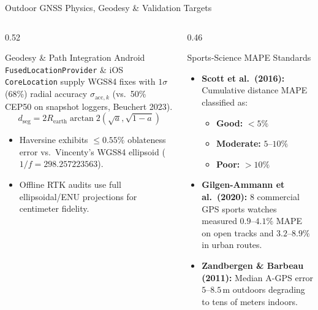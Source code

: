 \documentclass[aspectratio=169,10pt]{beamer}
\begin{document}
\begin{frame}{Outdoor GNSS Physics, Geodesy \& Validation Targets}
  \begin{columns}[T]
    \begin{column}{0.52\textwidth}
      \begin{block}{Geodesy \& Path Integration}
        \small
        Android \texttt{FusedLocationProvider} \& iOS \texttt{CoreLocation} supply WGS84 fixes with $1\sigma$ (68\%) radial accuracy $\sigma_{\text{acc},k}$ (vs.\ 50\% CEP50 on snapshot loggers, Beuchert 2023).
        \[
          d_{\text{seg}} = 2R_{\text{earth}}\arctan2\!\left(\sqrt{a},\sqrt{1-a}\right)
        \]
        \begin{itemize}\small
          \item Haversine exhibits $\le 0.55\%$ oblateness error vs.\ Vincenty's WGS84 ellipsoid ($1/f = 298.257223563$).
          \item Offline RTK audits use full ellipsoidal/ENU projections for centimeter fidelity.
        \end{itemize}
      \end{block}
    \end{column}
    \begin{column}{0.46\textwidth}
      \begin{exampleblock}{Sports-Science MAPE Standards}
        \begin{itemize}\small
          \item \textbf{Scott et al.\ (2016):} Cumulative distance MAPE classified as:
            \begin{itemize}\footnotesize
              \item \textbf{Good:} $<5\%$
              \item \textbf{Moderate:} $5$--$10\%$
              \item \textbf{Poor:} $>10\%$
            \end{itemize}
          \item \textbf{Gilgen-Ammann et al.\ (2020):} 8 commercial GPS sports watches measured $0.9$--$4.1\%$ MAPE on open tracks and $3.2$--$8.9\%$ in urban routes.
          \item \textbf{Zandbergen \& Barbeau (2011):} Median A-GPS error $5$--$8.5$\,m outdoors degrading to tens of meters indoors.
        \end{itemize}
      \end{exampleblock}
    \end{column}
  \end{columns}
\end{frame}
\end{document}

